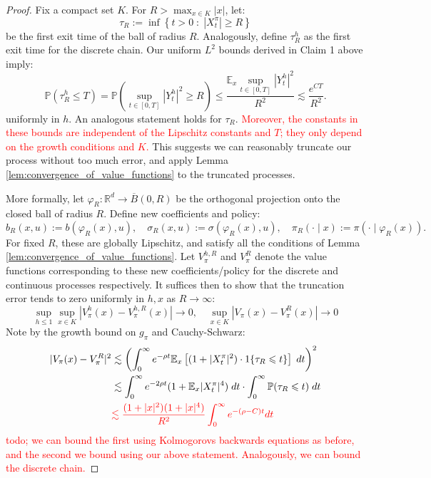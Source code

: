 \documentclass[11pt,oneside,reqno]{article}
\theoremstyle{plain}
\theoremstyle{definition}
\numberwithin{equation}{section}
\renewcommand{\leq}{\leqslant}
\renewcommand{\geq}{\geqslant}
\renewcommand{\phi}{\varphi}
\newcommand{\R}{\mathbb{R}}
\newcommand{\E}{\mathbb{E}}
\renewcommand{\P}{\mathbb{P}}
\newcommand{\red}{\textcolor{red}}
\begin{document}
\begin{proof}
	Fix a compact set $K$. For $R > \max_{x \in K} |x|$, let:
	\[\tau_R := \inf \left\{t > 0 \; : \; |X_t^\pi| \geq R\right\}\]
	\noindent be the first exit time of the ball of radius $R$. Analogously, define $\tau_R^h$ as the first
	exit time for the discrete chain. Our uniform $L^2$ bounds derived in Claim 1 above imply:
	\[\P(\tau_R^h \leq T) = \P\left(\sup_{t \in [0,T]} |Y_t^h|^2 \geq R\right) \leq \frac{\E_x \sup_{t \in [0,T]} |Y_t^h|^2}{R^2} \lesssim\frac{e^{CT}}{R^2}. \]
	\noindent uniformly in $h$. An analogous statement holds for $\tau_R$. \red{Moreover, the constants in these bounds are independent of the Lipschitz constants and $T$; they only depend on the growth conditions and $K$.} This suggests we can reasonably truncate
	our process without too much error, and apply Lemma \ref{lem:convergence_of_value_functions} to the truncated processes. 
	
	More formally, let $\phi_R: \R^d \to \overline{B}(0, R)$ be the orthogonal projection onto the closed ball of radius $R$. Define new coefficients and policy:
	\[b_R(x, u) := b(\phi_R(x), u), \quad \sigma_R(x, u) := \sigma(\phi_R(x), u), \quad \pi_R(\cdot \mid x) := \pi( \cdot \mid \phi_R(x)).\]
	\noindent For fixed $R$, these are globally Lipschitz, and satisfy all the conditions of Lemma \ref{lem:convergence_of_value_functions}. Let $V_\pi^{h, R}$ and $V_\pi^R$ denote the
	value functions corresponding to these new coefficients/policy for the discrete and continuous processes respectively. It suffices then to show that the truncation error tends to zero uniformly in $h, x$ as $R \to \infty$:
	\[\sup_{h \leq 1} \sup_{x \in K} |V_\pi^h(x) - V_\pi^{h,R}(x)| \to 0, \quad  \sup_{x \in K} |V_\pi(x) - V_\pi^{R}(x)| \to 0\]
	\noindent Note by the growth bound on $g_\pi$ and Cauchy-Schwarz:
	\begin{align*}
		|V_\pi(x) - V_\pi^R|^2 & \lesssim \left(\int_0^\infty e^{-\rho t} \E_x \left[(1 + |X_t^\pi|^2) \cdot 1\{\tau_R \leq t\} \right]\; dt \right)^2 \\
		& \lesssim \int_0^\infty e^{-2\rho t} (1 + \E_x|X_t^\pi|^4) \;dt \cdot\int_0^\infty \P(\tau_R \leq t) \; dt\\
		& \red{\lesssim \frac{(1 + |x|^2)(1 + |x|^4)}{R^2} \int_0^\infty e^{-(\rho - C)t} dt} 
	\end{align*}
	\red{todo; we can bound the first using Kolmogorovs backwards equations as before, and the second we bound using our above statement. Analogously, we can bound the discrete chain.}
\end{proof}
\end{document}
